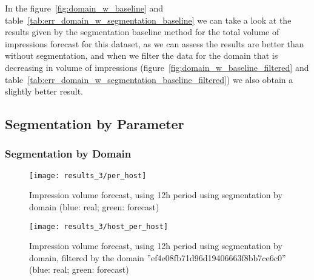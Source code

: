In the figure~\ref{fig:domain_w_baseline} and
table~\ref{tab:err_domain_w_segmentation_baseline} we can take a look at the
results given by the segmentation baseline method for the total volume of
impressions forecast for this dataset, as we can assess the results are better
than without segmentation, and when we filter the data for the domain that is
decreasing in volume of impressions (figure~\ref{fig:domain_w_baseline_filtered}
and table~\ref{tab:err_domain_w_segmentation_baseline_filtered}) we also obtain
a slightly better result.

\subsection*{Segmentation by Parameter}

\subsubsection*{Segmentation by Domain}

\begin{figure}[!ht]
\centering
\begin{minipage}[t]{0.45\linewidth}
\texttt{[image: results\_3/per\_host]}

\caption[Volume
impression forecast, domain, cluster by domain]{Impression volume
forecast, using 12h period using segmentation by domain (blue: real; green: forecast)}
\label{fig:domain_w_domain}


\end{minipage}
\quad
\begin{minipage}[t]{0.45\linewidth}
\texttt{[image: results\_3/host\_per\_host]} 
\caption[Volume
impression forecast, domain, cluster by domain, filtered]{Impression volume
forecast, using 12h period using segmentation by domain, filtered by the domain ''ef4e08fb71d96d19406663f8bb7ce6c0'' (blue: real; green: forecast)}
\label{fig:domain_w_domain_filtered}

\end{minipage}

\end{figure}

